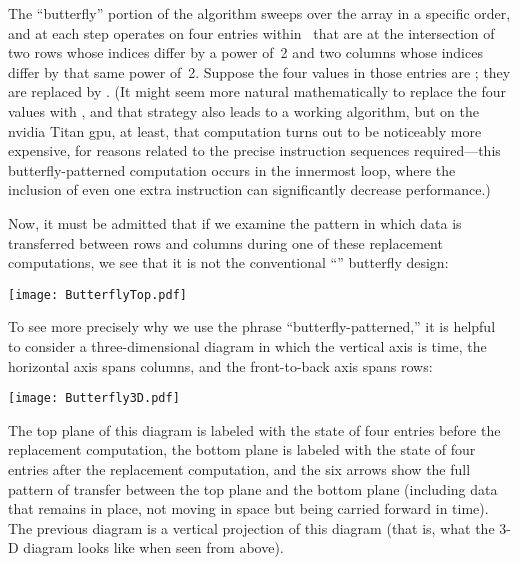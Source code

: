 \documentclass[10pt,nohyperref]{sigplanconf}
\begin{document}
The ``butterfly'' portion of the algorithm sweeps over the array  in a specific order,
and at each step
operates on four entries within~ that are at the intersection of two rows whose indices differ by a power of~2
and two columns whose indices differ by that same power of~2.  Suppose the four values in those entries are
; they are replaced by
.
(It might seem more natural mathematically to replace
the four values with ,
and that strategy also leads to a working algorithm,
but on the {\sc nvidia} Titan {\sc gpu}, at least, that computation turns out to be noticeably more expensive,
for reasons related to the precise instruction sequences required---this butterfly-patterned computation
occurs in the innermost loop, where the inclusion of even one extra instruction can significantly decrease performance.)

\newcommand\replace[4]{\hbox{}}

\newcommand\diagramshrinktop{\vskip-5pt }
\newcommand\diagramshrink{\vskip-7pt }

Now, it must be admitted that if we examine the pattern in which data is transferred between rows and
columns during one of these replacement computations, we see that it is not the conventional ``'' butterfly design:
\begin{center}
\vbox{\diagramshrinktop\texttt{[image: ButterflyTop.pdf]}\diagramshrink}
\end{center}
To see more precisely why we use the phrase ``butterfly-patterned,'' it is helpful to consider a three-dimensional diagram
in which the vertical axis is time, the horizontal axis spans columns, and the front-to-back axis spans rows:
\begin{center}
\vbox{\diagramshrinktop\texttt{[image: Butterfly3D.pdf]}\diagramshrink}
\end{center}
The top plane of this diagram is labeled with the state of four entries before the replacement computation,
the bottom plane is labeled with the state of four entries after the replacement computation,
and the six arrows show the full pattern of transfer between the top plane and the bottom plane
(including data that remains in place, not moving in space but being carried forward in time).
The previous diagram is a vertical projection of this diagram (that is, what the 3-D diagram looks like when seen from above).
\end{document}
